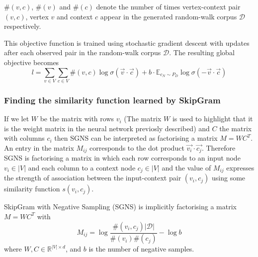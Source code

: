 \documentclass[a4paper]{article}
\renewcommand{\E}{\mathbb E}
\newcommand{\D}{\mathcal D}
\begin{document}
\begin{notation} $\#(v,c)$, $\#(v)$ and $\#(c)$ denote the number of times vertex-context pair
  $(v,c)$, vertex $v$ and context $c$ appear in the generated random-walk corpus
  $\mathcal{D}$ respectively.
\end{notation}

This objective function is trained using stochastic gradient descent with
updates after each  observed pair in the random-walk corpus $\D$. The resulting
global objective becomes
\begin{equation}
  l = \sum_{v \in V} \sum_{c \in V}\#(v,c)\log{\sigma(\vec{v} \cdot \vec{c})} +
  b \cdot \E_{c_{N} \sim P_D}\log{\sigma(-\vec{v} \cdot \vec{c})}
\end{equation}

\subsubsection{Finding the similarity function learned by SkipGram}

If we let $W$ be the matrix with rows $v_i$ (The matrix $W$ is used to highlight
that it is the weight matrix in the neural network previosly described) and $C$ the matrix with columns
$c_i$ then SGNS can be interpreted as factorising a matrix $M = WC^T$. An entry in the matrix $M_{ij}$ corresponds to the dot product $\vec{v_i} \cdot
\vec{c_j}$. Therefore SGNS is factorising a matrix in which each row corresponds
to an input node $v_i \in |V|$ and each column to a context node $c_j \in |V|$ and the value of $M_{ij}$ expresses the
strength of association between the input-context pair $(v_i, c_j)$ using some similarity
function $s(v_i,c_j)$. 
\begin{theorem}
  SkipGram with Negative Sampling (SGNS) is implicitly factorising a matrix $M =
  WC^T$ with
  \[M_{ij} = \log{\frac{\#(v_i,c_j)|\mathcal{D}|}{\#(v_i)\#(c_j)}} - \log{b}\]
  where $W, C \in \mathbb{R}^{|V| \times d}$, and $b$ is the number of negative samples.
\end{theorem}
\end{document}
